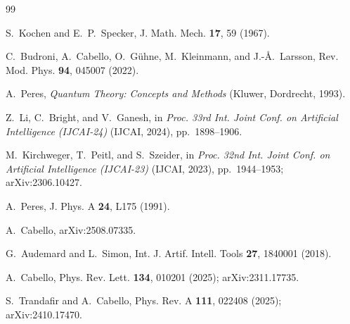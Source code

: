 \documentclass[twocolumn,prl,superscriptaddress,nofootinbib]{revtex4-2}
\begin{document}
\begin{thebibliography}{99}

S.~Kochen and E.~P.~Specker, J. Math. Mech. \textbf{17}, 59 (1967).

C.~Budroni, A.~Cabello, O.~G\"uhne, M.~Kleinmann, and J.-{\AA}.~Larsson,
Rev. Mod. Phys. \textbf{94}, 045007 (2022).

A.~Peres, \textit{Quantum Theory: Concepts and Methods}
(Kluwer, Dordrecht, 1993).

Z.~Li, C.~Bright, and V.~Ganesh, in \textit{Proc. 33rd Int. Joint Conf. on
Artificial Intelligence (IJCAI-24)} (IJCAI, 2024), pp.~1898--1906.

M.~Kirchweger, T.~Peitl, and S.~Szeider, in \textit{Proc. 32nd Int. Joint Conf.
on Artificial Intelligence (IJCAI-23)} (IJCAI, 2023), pp.~1944--1953;
arXiv:2306.10427.

A.~Peres, J. Phys. A \textbf{24}, L175 (1991).

A.~Cabello, arXiv:2508.07335.

G.~Audemard and L.~Simon, Int. J. Artif. Intell. Tools \textbf{27}, 1840001 (2018).

A.~Cabello, Phys. Rev. Lett. \textbf{134}, 010201 (2025); arXiv:2311.17735.

S.~Trandafir and A.~Cabello, Phys. Rev. A \textbf{111}, 022408 (2025);
arXiv:2410.17470.

\end{thebibliography}
\end{document}
